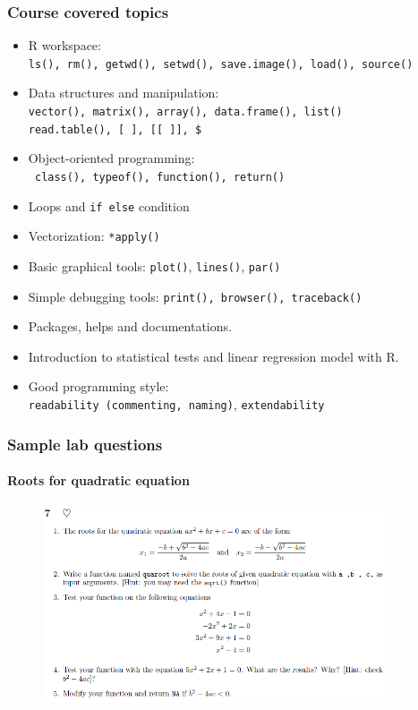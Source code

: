 \documentclass[10pt]{beamer}
\begin{document}
\begin{frame}
  \frametitle{Course covered topics}
  \begin{itemize}
  \item R workspace: \\\texttt{ls(), rm(), getwd(), setwd(), save.image(), load(), source()}
  \item Data structures and manipulation:
    \\\texttt{vector(), matrix(), array(), data.frame(), list()}
    \\\texttt{read.table(), [ ], [[ ]], \$}

  \item Object-oriented programming: \\\texttt{ class(), typeof(), function(), return()}
  \item Loops and \texttt{if else} condition
  \item Vectorization: \texttt{*apply()}
  \item Basic graphical tools: \texttt{plot()}, \texttt{lines()}, \texttt{par()}
  \item Simple debugging tools: \texttt{print(), browser(), traceback()}
  \item Packages, helps and documentations.
  \item Introduction to statistical tests and linear regression model with R.
  \item Good programming style: \\\texttt{readability (commenting, naming)}, \texttt{extendability}
  \end{itemize}
\end{frame}


\begin{frame}
  \frametitle{Sample lab questions}
  \framesubtitle{Roots for quadratic equation}
  \begin{figure}
    \centering
    \includegraphics[width=0.9\textwidth]{quaroot}
  \end{figure}
\end{frame}
\end{document}
